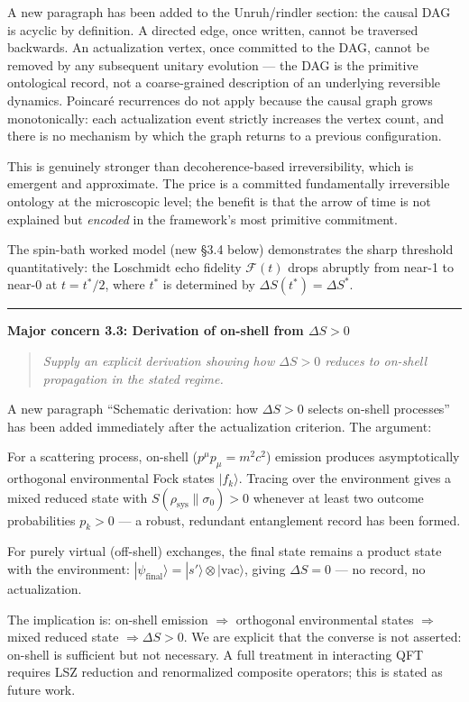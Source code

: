\documentclass[11pt]{article}
\newcommand{\refereequote}[1]{%
  \begin{quote}\itshape\small #1\end{quote}}
\begin{document}
A new paragraph has been added to the Unruh/rindler section: the causal DAG
is acyclic by definition. A directed edge, once written, cannot be traversed
backwards. An actualization vertex, once committed to the DAG, cannot be
removed by any subsequent unitary evolution — the DAG is the primitive
ontological record, not a coarse-grained description of an underlying
reversible dynamics. Poincar\'{e} recurrences do not apply because the causal
graph grows monotonically: each actualization event strictly increases the
vertex count, and there is no mechanism by which the graph returns to a
previous configuration.

This is genuinely stronger than decoherence-based irreversibility, which is
emergent and approximate. The price is a committed fundamentally irreversible
ontology at the microscopic level; the benefit is that the arrow of time is
not explained but \emph{encoded} in the framework's most primitive commitment.

The spin-bath worked model (new \S3.4 below) demonstrates the sharp threshold
quantitatively: the Loschmidt echo fidelity $\mathcal{F}(t)$ drops abruptly
from near-1 to near-0 at $t = t^*/2$, where $t^*$ is determined by
$\Delta S(t^*) = \Delta S^*$.

\bigskip\hrule\bigskip

\noindent\textbf{Major concern 3.3: Derivation of on-shell from
$\Delta S > 0$}

\refereequote{Supply an explicit derivation showing how $\Delta S > 0$ reduces
to on-shell propagation in the stated regime.}

A new paragraph ``Schematic derivation: how $\Delta S > 0$ selects on-shell
processes'' has been added immediately after the actualization criterion.
The argument:

For a scattering process, on-shell ($p^\mu p_\mu = m^2c^2$) emission produces
asymptotically orthogonal environmental Fock states $|f_k\rangle$. Tracing
over the environment gives a mixed reduced state with $S(\rho_{\mathrm{sys}}\|
\sigma_0) > 0$ whenever at least two outcome probabilities $p_k > 0$ — a
robust, redundant entanglement record has been formed.

For purely virtual (off-shell) exchanges, the final state remains a product
state with the environment: $|\psi_{\mathrm{final}}\rangle = |s'\rangle
\otimes |\mathrm{vac}\rangle$, giving $\Delta S = 0$ — no record, no
actualization.

The implication is: on-shell emission $\Rightarrow$ orthogonal environmental
states $\Rightarrow$ mixed reduced state $\Rightarrow \Delta S > 0$. We are
explicit that the converse is not asserted: on-shell is sufficient but not
necessary. A full treatment in interacting QFT requires LSZ reduction and
renormalized composite operators; this is stated as future work.
\end{document}
